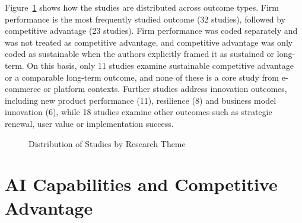 Figure~\ref{fig:themes} shows how the studies are distributed across outcome types. Firm performance is the most frequently studied outcome (32 studies), followed by competitive advantage (23 studies). Firm performance was coded separately and was not treated as competitive advantage, and competitive advantage was only coded as sustainable when the authors explicitly framed it as sustained or long-term. On this basis, only 11 studies examine sustainable competitive advantage or a comparable long-term outcome, and none of these is a core study from e-commerce or platform contexts. Further studies address innovation outcomes, including new product performance (11), resilience (8) and business model innovation (6), while 18 studies examine other outcomes such as strategic renewal, user value or implementation success.

\begin{figure}[H]
  \centering
  \caption{Distribution of Studies by Research Theme}
  \label{fig:themes}
\end{figure}

\section{AI Capabilities and Competitive Advantage}
\label{sec:results-ai-ca}


